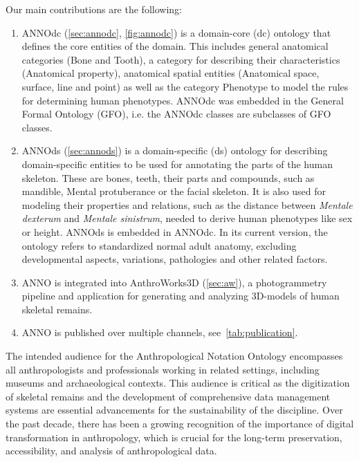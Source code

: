 \documentclass[sw]{iosart2x}
\newcommand{\aw}{AnthroWorks3D}
\newcommand{\latin}[1]{\emph{#1}}
\begin{document}
%
Our main contributions are the following:
\begin{enumerate}
\item ANNOdc (\cref{sec:annodc}, \cref{fig:annodc}) is a domain-core (dc) ontology that defines the core entities of the domain.
This includes general anatomical categories (Bone and Tooth), a category for describing their characteristics (Anatomical property), anatomical spatial entities (Anatomical space, surface, line and point) as well as the category Phenotype to model the rules for determining human phenotypes.
ANNOdc was embedded in the General Formal Ontology (GFO), i.e. the ANNOdc classes are subclasses of GFO classes.
%
\item ANNOds (\cref{sec:annods}) is a domain-specific (ds) ontology for describing domain-specific entities to be used for annotating the parts of the human skeleton.
These are bones, teeth, their parts and compounds, such as mandible, Mental protuberance or the facial skeleton.
It is also used for modeling their properties and relations, such as the distance between \latin{Mentale dexterum} and \latin{Mentale sinistrum}, needed to derive human phenotypes like sex or height.
ANNOds is embedded in ANNOdc.
In its current version, the ontology refers to standardized normal adult anatomy, excluding developmental aspects, variations, pathologies and other related factors.
%
\item ANNO is integrated into \aw{} (\cref{sec:aw}), a photogrammetry pipeline and application for generating and analyzing 3D-models of human skeletal remains.
%
\item ANNO is published over multiple channels, see~\cref{tab:publication}.
%
\end{enumerate}

The intended audience for the Anthropological Notation Ontology encompasses all anthropologists and professionals working in related settings, including museums and archaeological contexts.
This audience is critical as the digitization of skeletal remains and the development of comprehensive data management systems are essential advancements for the sustainability of the discipline.
Over the past decade, there has been a growing recognition of the importance of digital transformation in anthropology, which is crucial for the long-term preservation, accessibility, and analysis of anthropological data.
\end{document}
